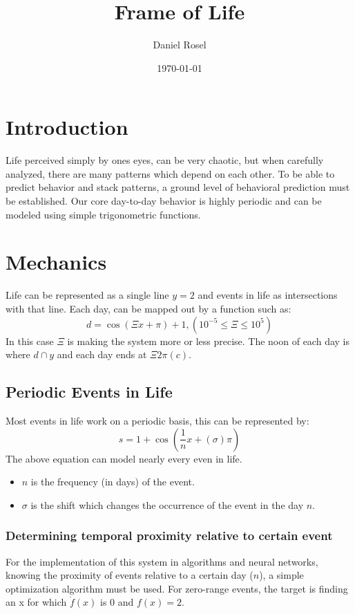 \documentclass[11pt]{article}
\author{Daniel Rosel}
\date{\today}
\title{Frame of Life}
\begin{document}
\maketitle
\tableofcontents


\section{Introduction}
\label{sec:org1979d4b}
Life perceived simply by ones eyes, can be very chaotic, but when carefully analyzed, there are many patterns which depend on each other. To be able to predict behavior and stack patterns, a ground level of behavioral prediction must be established. Our core day-to-day behavior is highly periodic and can be modeled using simple trigonometric functions.
\section{Mechanics}
\label{sec:org5bc44ce}
Life can be represented as a single line \(y = 2\) and events in life as intersections with that line. Each day, can be mapped out by a function such as:
\begin{equation}
    d = \cos{(\Xi x + \pi) + 1}, (10^{-5} \leq \Xi \leq 10^{5})
\end{equation}
In this case \(\Xi\) is making the system more or less precise. The noon of each day is where \(d \cap y\) and each day ends at \(\Xi2\pi(c)\).
\subsection{Periodic Events in Life}
\label{sec:org2e55719}
Most events in life work on a periodic basis, this can be represented by:
\begin{equation}
s = 1 + \cos{(\frac{1}{n}x + (\sigma)\pi)}
\end{equation}
The above equation can model nearly every even in life.
\begin{itemize}
\item \(n\) is the frequency (in days) of the event.
\item \(\sigma\) is the shift which changes the occurrence of the event in the day \(n\).
\end{itemize}
\subsubsection{Determining temporal proximity relative to certain event}
\label{sec:orgcce3672}
For the implementation of this system in algorithms and neural networks, knowing the proximity of events relative to a certain day (\(n\)), a simple optimization algorithm must be used. For zero-range events, the target is finding an x for which \(\dot{f}(x)\) is 0 and \(f(x) = 2\).
\end{document}
